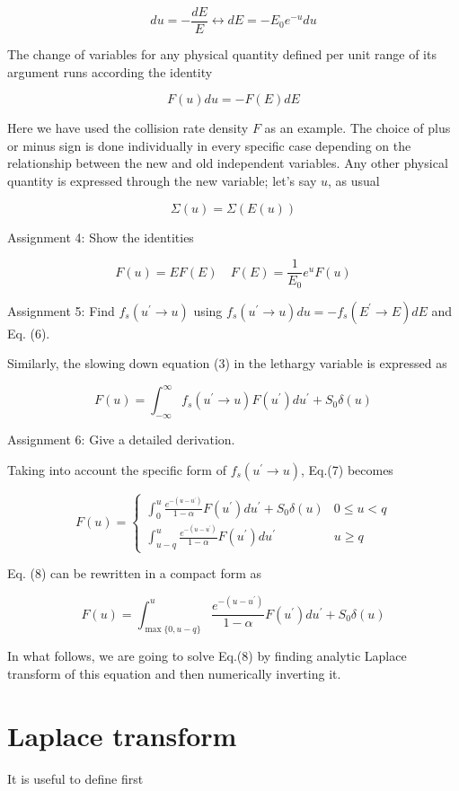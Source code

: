 \documentclass[10pt]{article}
\begin{document}
$$
d u=-\frac{d E}{E} \longleftrightarrow d E=-E_{0} e^{-u} d u
$$

The change of variables for any physical quantity defined per unit range of its argument runs according the identity

$$
F(u) d u=-F(E) d E
$$

Here we have used the collision rate density $F$ as an example. The choice of plus or minus sign is done individually in every specific case depending on the relationship between the new and old independent variables. Any other physical quantity is expressed through the new variable; let's say $u$, as usual

$$
\Sigma(u)=\Sigma(E(u))
$$

Assignment 4: Show the identities

$$
F(u)=E F(E) \quad F(E)=\frac{1}{E_{0}} e^{u} F(u)
$$

Assignment 5: Find $f_{s}\left(u^{\prime} \rightarrow u\right)$ using $f_{s}\left(u^{\prime} \rightarrow u\right) d u=-f_{s}\left(E^{\prime} \rightarrow E\right) d E$ and Eq. (6).

Similarly, the slowing down equation (3) in the lethargy variable is expressed as

$$
F(u)=\int_{-\infty}^{\infty} f_{s}\left(u^{\prime} \rightarrow u\right) F\left(u^{\prime}\right) d u^{\prime}+S_{0} \delta(u)
$$

Assignment 6: Give a detailed derivation.

Taking into account the specific form of $f_{s}\left(u^{\prime} \rightarrow u\right)$, Eq.(7) becomes

$$
F(u)=\left\{\begin{array}{lr}
\int_{0}^{u} \frac{e^{-\left(u-u^{\prime}\right)}}{1-\alpha} F\left(u^{\prime}\right) d u^{\prime}+S_{0} \delta(u) & 0 \leq u<q \\
\int_{u-q}^{u} \frac{e^{-\left(u-u^{\prime}\right)}}{1-\alpha} F\left(u^{\prime}\right) d u^{\prime} & u \geq q
\end{array}\right.
$$

Eq. (8) can be rewritten in a compact form as

$$
F(u)=\int_{\max \{0, u-q\}}^{u} \frac{e^{-\left(u-u^{\prime}\right)}}{1-\alpha} F\left(u^{\prime}\right) d u^{\prime}+S_{0} \delta(u)
$$

In what follows, we are going to solve Eq.(8) by finding analytic Laplace transform of this equation and then numerically inverting it.

\section{Laplace transform}
It is useful to define first
\end{document}
